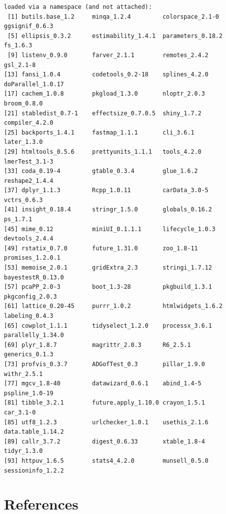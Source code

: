 \documentclass[12pt]{article}
\begin{document}
\begin{verbatim}
loaded via a namespace (and not attached):
 [1] butils.base_1.2     minqa_1.2.4         colorspace_2.1-0    ggsignif_0.6.3     
 [5] ellipsis_0.3.2      estimability_1.4.1  parameters_0.18.2   fs_1.6.3           
 [9] listenv_0.9.0       farver_2.1.1        remotes_2.4.2       gsl_2.1-8          
[13] fansi_1.0.4         codetools_0.2-18    splines_4.2.0       doParallel_1.0.17  
[17] cachem_1.0.8        pkgload_1.3.0       nloptr_2.0.3        broom_0.8.0        
[21] stabledist_0.7-1    effectsize_0.7.0.5  shiny_1.7.2         compiler_4.2.0     
[25] backports_1.4.1     fastmap_1.1.1       cli_3.6.1           later_1.3.0        
[29] htmltools_0.5.6     prettyunits_1.1.1   tools_4.2.0         lmerTest_3.1-3     
[33] coda_0.19-4         gtable_0.3.4        glue_1.6.2          reshape2_1.4.4     
[37] dplyr_1.1.3         Rcpp_1.0.11         carData_3.0-5       vctrs_0.6.3        
[41] insight_0.18.4      stringr_1.5.0       globals_0.16.2      ps_1.7.1           
[45] mime_0.12           miniUI_0.1.1.1      lifecycle_1.0.3     devtools_2.4.4     
[49] rstatix_0.7.0       future_1.31.0       zoo_1.8-11          promises_1.2.0.1   
[53] memoise_2.0.1       gridExtra_2.3       stringi_1.7.12      bayestestR_0.13.0  
[57] pcaPP_2.0-3         boot_1.3-28         pkgbuild_1.3.1      pkgconfig_2.0.3    
[61] lattice_0.20-45     purrr_1.0.2         htmlwidgets_1.6.2   labeling_0.4.3     
[65] cowplot_1.1.1       tidyselect_1.2.0    processx_3.6.1      parallelly_1.34.0  
[69] plyr_1.8.7          magrittr_2.0.3      R6_2.5.1            generics_0.1.3     
[73] profvis_0.3.7       ADGofTest_0.3       pillar_1.9.0        withr_2.5.1        
[77] mgcv_1.8-40         datawizard_0.6.1    abind_1.4-5         pspline_1.0-19     
[81] tibble_3.2.1        future.apply_1.10.0 crayon_1.5.1        car_3.1-0          
[85] utf8_1.2.3          urlchecker_1.0.1    usethis_2.1.6       data.table_1.14.2  
[89] callr_3.7.2         digest_0.6.33       xtable_1.8-4        tidyr_1.3.0        
[93] httpuv_1.6.5        stats4_4.2.0        munsell_0.5.0       sessioninfo_1.2.2
\end{verbatim}

\clearpage

\section*{References}
\label{sec:org9a9196a}
\begingroup
\renewcommand{\section}[2]{}
\end{document}
